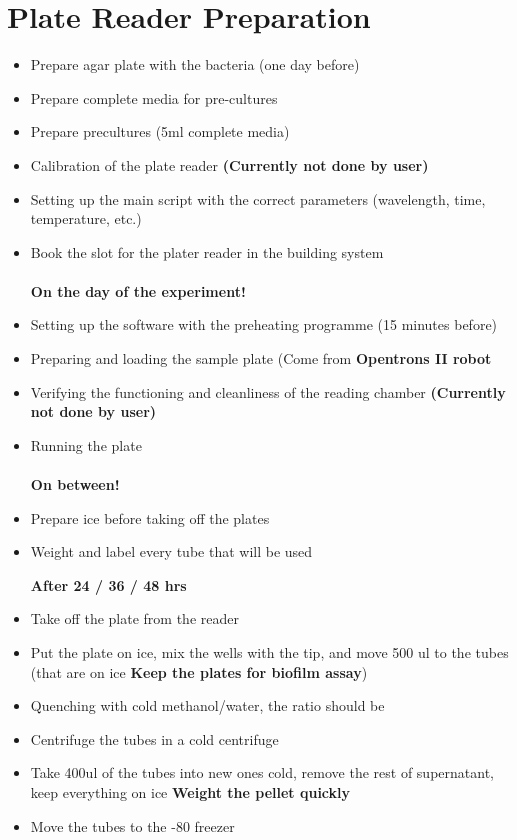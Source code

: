 \documentclass{article}
\newcommand{\bigbox}{\raisebox{\depth}{\scalebox{1.5}{$\square$}}}
\begin{document}
\section{Plate Reader Preparation}
\begin{itemize}
\item[\bigbox] {Prepare agar plate with the bacteria (one day before)}
\item[\bigbox] {Prepare complete media for pre-cultures}
\item[\bigbox] {Prepare precultures (5ml complete media)}
\item[\bigbox] {Calibration of the plate reader \textbf{(Currently not done by user)}}
\item[\bigbox] {Setting up the main script with the correct parameters (wavelength, time, temperature, etc.)}
\item[\bigbox] {Book the slot for the plater reader in the building system}
\\\\
\textbf{On the day of the experiment!}

\item[\bigbox] {Setting up the software with the preheating programme (15 minutes before)}
\item[\bigbox] {Preparing and loading the sample plate (Come from \textbf{Opentrons II robot} }

\item[\bigbox] {Verifying the functioning and cleanliness of the reading chamber  \textbf{(Currently not done by user)}}
\item[\bigbox] {Running the plate}
\\\\
\textbf{On between!}
\item[\bigbox] {Prepare ice before taking off the plates}
\item[\bigbox] {Weight and label every tube that will be used}

\textbf{After 24 / 36 / 48 hrs}
\item[\bigbox] {Take off the plate from the reader}
\item[\bigbox] {Put the plate on ice, mix the wells with the tip, and move 500 ul to the tubes (that are on ice \textbf{Keep the plates for biofilm assay})}
\item[\bigbox]{Quenching with cold methanol/water, the ratio should be }
\item[\bigbox] {Centrifuge the tubes in a cold centrifuge}
\item[\bigbox] {Take 400ul of the tubes into new ones cold, remove the rest of supernatant, keep everything on ice \textbf{Weight the pellet quickly}}
\item[\bigbox] {Move the tubes to the -80 freezer}
\end{itemize}
\end{document}
